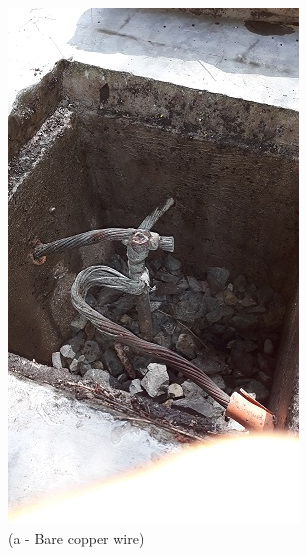 \begin{figure}
	\begin{minipage}[b]{0.25\linewidth}
		\centering
				\includegraphics[width=\textwidth]{figures/R1P_lightning/grounding.jpg}
		\caption*{(a - Bare copper wire)}
	\end{minipage}
	\hspace{0.05cm}
	\begin{minipage}[b]{0.25\linewidth}
		\centering

\end{minipage}
\end{figure}
